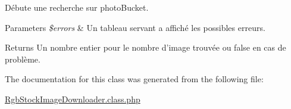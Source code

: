 Débute une recherche sur photo\-Bucket. 


\begin{DoxyParams}{Parameters}
{\em \$errors} & Un tableau servant a affiché les possibles erreurs. \\
\hline
\end{DoxyParams}
\begin{DoxyReturn}{Returns}
Un nombre entier pour le nombre d'image trouvée ou false en cas de problème. 
\end{DoxyReturn}


The documentation for this class was generated from the following file\-:\begin{DoxyCompactItemize}
\item 
\hyperlink{_rgb_stock_image_downloader_8class_8php}{Rgb\-Stock\-Image\-Downloader.\-class.\-php}\end{DoxyCompactItemize}
